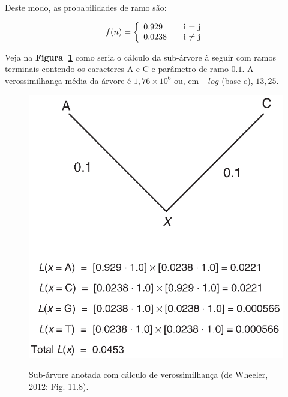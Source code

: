 \begin{refsection}
Deste modo, as probabilidades de ramo são:

\begin{center}
\begin{equation}
f(n) = \left\{
  \begin{array}{l l}
    0.929 & \quad \text{i $=$ j}\\
    0.0238 & \quad \text{i $\neq$ j}
  \end{array} \right.
\end{equation}
\end{center}

Veja na \textbf{Figura~\ref{tut12:fig:exemplo}} como seria o cálculo da sub-árvore à seguir com ramos terminais contendo os caracteres A e C e parâmetro de ramo $0.1$. A verossimilhança média da árvore é $1,76 \times 10^{6}$ ou, em $-log$ (base $e$), $13,25$.

  \begin{figure}[H]
       \centering
      {\includegraphics[scale=1.0]{figures/tut12/exemplo.eps}}
	{\caption[Sub-árvore anotada com cálculo de verossimilhança]{Sub-árvore anotada com cálculo de verossimilhança (de Wheeler, 2012: Fig. 11.8).}\label{tut12:fig:exemplo}}
  \end{figure}



\end{refsection}
